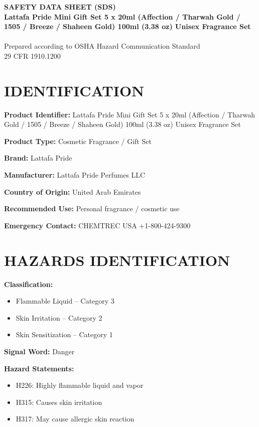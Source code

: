 \documentclass[11pt]{article}
\begin{document}
\begin{center}
{\LARGE \textbf{SAFETY DATA SHEET (SDS)}}\\[6pt]
{\Large \textbf{Lattafa Pride Mini Gift Set 5 x 20ml (Affection / Tharwah Gold / 1505 / Breeze / Shaheen Gold) 100ml (3.38 oz) Unisex Fragrance Set}}\\
{\large \textbf{}}\\[6pt]
Prepared according to OSHA Hazard Communication Standard\\
29 CFR 1910.1200
\end{center}

\vspace{10pt}

\section{IDENTIFICATION}

\textbf{Product Identifier:} Lattafa Pride Mini Gift Set 5 x 20ml (Affection / Tharwah Gold / 1505 / Breeze / Shaheen Gold) 100ml (3.38 oz) Unisex Fragrance Set

\textbf{Product Type:} Cosmetic Fragrance / Gift Set

\textbf{Brand:} Lattafa Pride

\textbf{Manufacturer:} Lattafa Pride Perfumes LLC

\textbf{Country of Origin:} United Arab Emirates

\textbf{Recommended Use:} Personal fragrance / cosmetic use

\textbf{Emergency Contact:} CHEMTREC USA +1-800-424-9300

\section{HAZARDS IDENTIFICATION}

\textbf{Classification:}
\begin{itemize}[noitemsep]
    \item Flammable Liquid -- Category 3
    \item Skin Irritation -- Category 2
    \item Skin Sensitization -- Category 1
\end{itemize}

\textbf{Signal Word:} Danger

\textbf{Hazard Statements:}
\begin{itemize}[noitemsep]
    \item H226: Highly flammable liquid and vapor
    \item H315: Causes skin irritation
    \item H317: May cause allergic skin reaction
\end{itemize}
\end{document}
